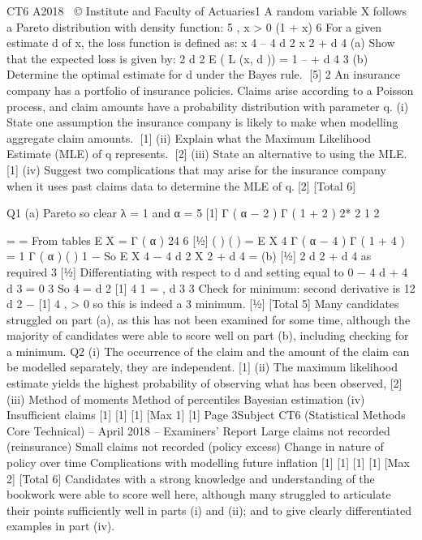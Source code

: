 CT6 A2018 
© Institute and Faculty of Actuaries1
A random variable X follows a Pareto distribution with density function:
5
, x > 0
(1 + x) 6
For a given estimate d of x, the loss function is defined as:
x 4 – 4 d 2 x 2 + d 4
(a)
Show that the expected loss is given by:
2 d 2
E ( L (x, d )) = 1 –
+ d 4
3
(b)
Determine the optimal estimate for d under the Bayes rule.
[5]
2
An insurance company has a portfolio of insurance policies. Claims arise according
to a Poisson process, and claim amounts have a probability distribution with
parameter q.
(i) State one assumption the insurance company is likely to make when modelling
aggregate claim amounts.
[1]
(ii) Explain what the Maximum Likelihood Estimate (MLE) of q represents.
[2]
(iii) State an alternative to using the MLE.
[1]
(iv) Suggest two complications that may arise for the insurance company when it
uses past claims data to determine the MLE of q.[2]
[Total 6]


Q1
(a)
Pareto so clear λ = 1 and α = 5 [1]
Γ ( α − 2 ) Γ ( 1 + 2 ) 2* 2 1
2
  
= =
From tables E X =
Γ ( α )
24 6 [1⁄2]
( )
( )
=
E X 4
Γ ( α − 4 ) Γ ( 1 + 4 )
= 1
Γ ( α )
(
)
1 −
So E X 4 − 4 d 2 X 2 + d 4 =
(b)
[1⁄2]
2 d 2
+ d 4 as required
3
[1⁄2]
Differentiating with respect to d and setting equal to 0
−
4 d
+ 4 d 3 = 0
3
So 4 =
d 2
[1]
4
1
=
,  
d
3
3
Check for minimum: second derivative is 12 d 2 −
[1]
4
, > 0 so this is indeed a
3
minimum.
[1⁄2]
[Total 5]
Many candidates struggled on part (a), as this has not been examined
for some time, although the majority of candidates were able to score
well on part (b), including checking for a minimum.
Q2
(i) The occurrence of the claim and the amount of the claim can be modelled
separately, they are independent.
[1]
(ii) The maximum likelihood estimate yields the highest probability of observing
what has been observed,
[2]
(iii) Method of moments
Method of percentiles
Bayesian estimation
(iv) Insufficient claims
[1]
[1]
[1]
[Max 1]
[1]
Page 3Subject CT6 (Statistical Methods Core Technical) – April 2018 – Examiners’ Report
Large claims not recorded (reinsurance)
Small claims not recorded (policy excess)
Change in nature of policy over time
Complications with modelling future inflation
[1]
[1]
[1]
[1]
[Max 2]
[Total 6]
Candidates with a strong knowledge and understanding of the
bookwork were able to score well here, although many struggled to
articulate their points sufficiently well in parts (i) and (ii); and to give
clearly differentiated examples in part (iv).
